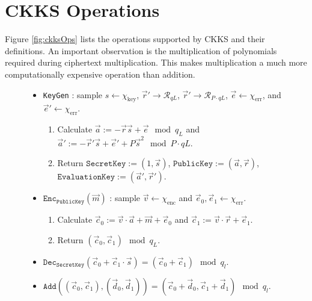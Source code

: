 \setlength{\leftskip}{0cm}





\section{CKKS Operations}
\label{app:operations}
\setlength{\leftskip}{0.25cm}
\indent \indent
Figure \ref{fig:ckksOps} lists the operations supported by CKKS and their definitions. An important observation is the multiplication of polynomials required during ciphertext multiplication. This makes multiplication a much more computationally expensive operation than addition.

\begin{figure}[ht]
    \centering
    \begin{tcolorbox}
        \begin{itemize}[leftmargin=0.1cm]
            \item \texttt{KeyGen} : sample $s \leftarrow \chi_{\text{key}}$, $\vec{r}' \rightarrow \mathcal{R}_{qL}$, $\vec{r}' \rightarrow \mathcal{R}_{P \cdot qL}$, $\vec{e} \leftarrow \chi_{\text{err}}$, and $\vec{e}' \leftarrow \chi_{\text{err}}$.
            \begin{enumerate}
                \item Calculate $\vec{a} := - \vec{r} \vec{s} + \vec{e} \mod q_L$ and $\vec{a}' := -\vec{r}' \vec{s} + \vec{e}' + P \vec{s}^2 \mod P \cdot qL$.
                \item Return $\texttt{SecretKey} := (1, \vec{s})$, $\texttt{PublicKey} := (\vec{a}, \vec{r})$, $\texttt{EvaluationKey} := (\vec{a}', \vec{r}')$.
            \end{enumerate}
            \item $\texttt{Enc}_\texttt{PublicKey}(\vec{m})$ : sample $\vec{v} \leftarrow \chi_{\text{enc}}$ and $\vec{e}_0, \vec{e}_1 \leftarrow \chi_{\text{err}}$.
            \begin{enumerate}
                \item Calculate $\vec{c}_0 := \vec{v} \cdot \vec{a} + \vec{m} + \vec{e}_0$ and $\vec{c}_1 := \vec{v} \cdot \vec{r} + \vec{e}_1$.
                \item Return $(\vec{c}_0, \vec{c}_1) \mod q_L$.
            \end{enumerate}
            \item $\texttt{Dec}_\texttt{SecretKey}(\vec{c}_0 + \vec{c}_1 \cdot \vec{s}) = (\vec{c}_0 + \vec{c}_1) \mod q_l$.
            \item $\texttt{Add}((\vec{c}_0, \vec{c}_1), (\vec{d}_0, \vec{d}_1)) = (\vec{c}_0 + \vec{d}_0, \vec{c}_1 + \vec{d}_1) \mod q_l$.

\end{itemize}
\end{tcolorbox}
\end{figure}
